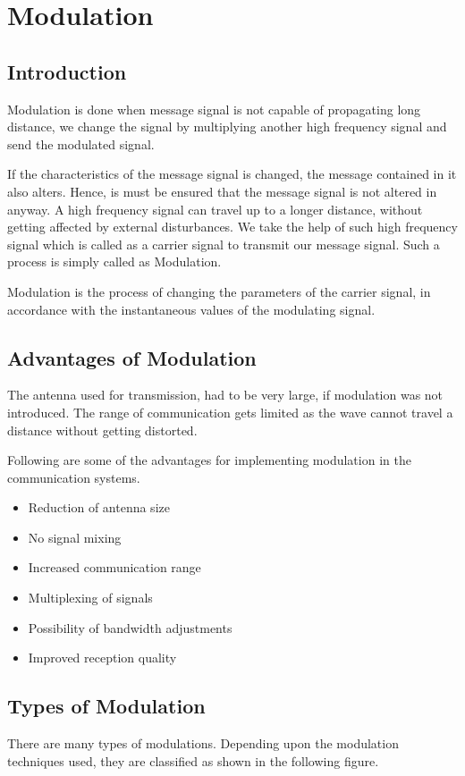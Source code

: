 \section{Modulation}

\subsection{Introduction}
Modulation is done when message signal is not capable of propagating long distance, we change the signal by multiplying another high frequency signal and send the modulated signal.

\par If the characteristics of the message signal is changed, the message contained in it also alters. Hence, is must be ensured that the message signal is not altered in anyway. A high frequency signal can travel up to a longer distance, without getting affected by external disturbances. We take the help of such high frequency signal which is called as a carrier signal to transmit our message signal. Such a process is simply called as Modulation.

Modulation is the process of changing the parameters of the carrier signal, in accordance with the instantaneous values of the modulating signal.

\subsection{Advantages of Modulation}
The antenna used for transmission, had to be very large, if modulation was not introduced. The range of communication gets limited as the wave cannot travel a distance without getting distorted.

Following are some of the advantages for implementing modulation in the communication systems.

\begin{itemize}
  \item Reduction of antenna size
  \item No signal mixing
  \item Increased communication range
  \item Multiplexing of signals
  \item Possibility of bandwidth adjustments
  \item Improved reception quality

\end{itemize}

\subsection{Types of Modulation}
There are many types of modulations. Depending upon the modulation techniques used, they are classified as shown in the following figure.


